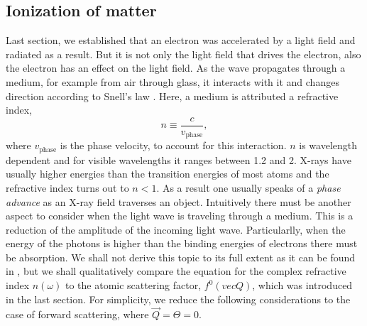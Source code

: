 \subsection{Ionization of matter}\label{sec:absorption}
Last section, we established that an electron was accelerated by a light field and radiated as a result.
But it is not only the light field that drives the electron, also the electron has an effect on the light field. As the wave propagates through a medium, for example from air through glass, it interacts with it and changes direction according to Snell's law \citep{Als-Nielson-2011-JWS}. Here, a medium is attributed a refractive index,
\begin{equation}
n\equiv\frac{c}{v_{\text{phase}}},
\label{eq:refractive-index}
\end{equation}
where $v_{\text{phase}}$ is the phase velocity, to account for this interaction. $n$ is wavelength dependent and for visible wavelengths it ranges between 1.2 and 2. X-rays have usually higher energies than the transition energies of most atoms and the refractive index turns out to $n<1$. As a result one usually speaks of a \textit{phase advance} as an X-ray field traverses an object.
Intuitively there must be another aspect to consider when the light wave is traveling through a medium. This is a reduction of the amplitude of the incoming light wave. Particularlly, when the energy of the photons is higher than the binding energies of electrons there must be absorption. We shall not derive this topic to its full extent as it can be found in \citep[][p. 55 ff]{Attwood-2007-CUP}, but we shall qualitatively compare the equation for the complex refractive index $n\left(\omega\right)$ to the atomic scattering factor, $f^{0}\left(vec{Q}\right)$, which was introduced in the last section. For simplicity, we reduce the following considerations to the case of forward scattering, where $\vec{Q}=\Theta=0$.\\[1\baselineskip]
